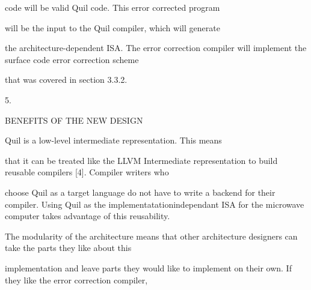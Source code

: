 \documentclass[a4paper,portrait,12pt]{article}
\begin{document}
\begin{flushleft}
code will be valid Quil code. This error corrected program
\end{flushleft}


\begin{flushleft}
will be the input to the Quil compiler, which will generate
\end{flushleft}





\begin{flushleft}
\newpage
the architecture-dependent ISA. The error correction compiler will implement the surface code error correction scheme
\end{flushleft}


\begin{flushleft}
that was covered in section 3.3.2.
\end{flushleft}





5.





\begin{flushleft}
BENEFITS OF THE NEW DESIGN
\end{flushleft}





\begin{flushleft}
Quil is a low-level intermediate representation. This means
\end{flushleft}


\begin{flushleft}
that it can be treated like the LLVM Intermediate representation to build reusable compilers [4]. Compiler writers who
\end{flushleft}


\begin{flushleft}
choose Quil as a target language do not have to write a backend for their compiler. Using Quil as the implementatationindependant ISA for the microwave computer takes advantage of this reusability.
\end{flushleft}


\begin{flushleft}
The modularity of the architecture means that other architecture designers can take the parts they like about this
\end{flushleft}


\begin{flushleft}
implementation and leave parts they would like to implement on their own. If they like the error correction compiler,
\end{flushleft}
\end{document}
